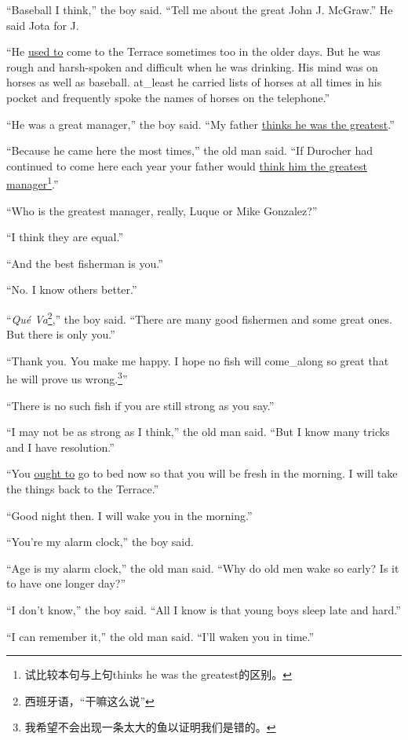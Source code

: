 \documentclass[fontset=ubuntu,zihao=-4]{ctexrep}
\begin{document}
``Baseball I think,'' the boy said. ``Tell me about the great John J. McGraw.'' He said Jota for J.

``He \uline{used to} come to the Terrace sometimes too in the older days. But
he was \gls{rough} and \gls{harsh}-\gls{spoken} and difficult when he was
drinking. His mind was on \glspl{horse} as well as baseball. \Gls{at_least}
he carried lists of horses at all times in his pocket and \gls{frequently}
spoke the names of horses on the telephone.''

``He was a great manager,'' the boy said. ``My father \uline{thinks he was the greatest}.''

``Because he came here the most times,'' the old man said. ``If Durocher had
continued to come here each year your father would \uline{think him the
  greatest manager}\footnote{试比较本句与上句thinks he was the greatest的区别。}.''

``Who is the greatest manager, really, Luque or Mike Gonzalez?''

``I think they are \gls{equal}.''

``And the best fisherman is you.''

``No. I know others better.''

``\emph{Qué Va}\footnote{西班牙语，“干嘛这么说”},'' the boy said. ``There are
many good fishermen and some great ones. But there is only you.''

``Thank you. You make me happy. I hope no fish will \gls{come_along} so great that
he will prove us wrong.\footnote{我希望不会出现一条太大的鱼以证明我们是错的。}''

``There is no such fish if you are still strong as you say.''

``I may not be as strong as I think,'' the old man said. ``But I know many tricks and I have \gls{resolution}.''

``You \uline{ought to} go to bed now so that you will be \gls{fresh} in the
morning. I will take the things back to the Terrace.''

``Good night then. I will wake you in the morning.''

``You're my alarm clock,'' the boy said.

``Age is my alarm clock,'' the old man said. ``Why do old men wake so early? Is it to have one longer day?''

``I don't know,'' the boy said. ``All I know is that young boys sleep late and hard.''

``I can remember it,'' the old man said. ``I'll \gls{waken} you in time.''
\end{document}

